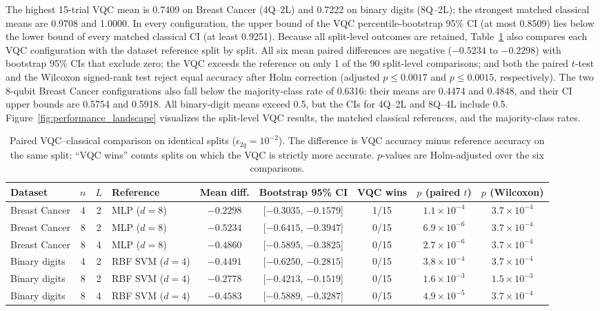 \documentclass[final,5p,times,number]{elsarticle}
\begin{document}
The highest 15-trial VQC mean is 0.7409 on Breast Cancer (4Q--2L) and
0.7222 on binary digits (8Q--2L); the strongest matched classical means
are 0.9708 and 1.0000. In every configuration, the upper bound of the VQC
percentile-bootstrap 95\% CI (at most 0.8509) lies below the lower bound
of every matched classical CI (at least 0.9251). Because all split-level
outcomes are retained, Table~\ref{tab:paired} also compares each VQC
configuration with the dataset reference split by split. All six mean
paired differences are negative ($-0.5234$ to $-0.2298$) with bootstrap
95\% CIs that exclude zero; the VQC exceeds the reference on only 1 of
the 90 split-level comparisons; and both the paired $t$-test and the
Wilcoxon signed-rank test reject equal accuracy after Holm correction
(adjusted $p\le0.0017$ and $p\le0.0015$, respectively). The two
8-qubit Breast Cancer configurations also fall below the majority-class
rate of 0.6316: their means are 0.4474 and 0.4848, and their CI upper
bounds are 0.5754 and 0.5918. All binary-digit means exceed 0.5, but the
CIs for 4Q--2L and 8Q--4L include 0.5.
Figure~\ref{fig:performance_landscape} visualizes the split-level VQC
results, the matched classical references, and the majority-class rates.

\begin{table}[!t]
\centering
\caption{Paired VQC--classical comparison on identical splits ($\epsilon_{2q}=10^{-2}$). The difference is VQC accuracy minus reference accuracy on the same split; ``VQC wins'' counts splits on which the VQC is strictly more accurate. $p$-values are Holm-adjusted over the six comparisons.}
\label{tab:paired}
\small
\begin{tabular}{lcclccccc}
\toprule
\textbf{Dataset} & \textbf{$n$} & \textbf{$L$} & \textbf{Reference} & \textbf{Mean diff.} & \textbf{Bootstrap 95\% CI} & \textbf{VQC wins} & \textbf{$p$ (paired $t$)} & \textbf{$p$ (Wilcoxon)} \\
\midrule
Breast Cancer & 4 & 2 & MLP ($d=8$) & $-0.2298$ & [$-0.3035$, $-0.1579$] & 1/15 & $1.1\times10^{-4}$ & $3.7\times10^{-4}$ \\
Breast Cancer & 8 & 2 & MLP ($d=8$) & $-0.5234$ & [$-0.6415$, $-0.3947$] & 0/15 & $6.9\times10^{-6}$ & $3.7\times10^{-4}$ \\
Breast Cancer & 8 & 4 & MLP ($d=8$) & $-0.4860$ & [$-0.5895$, $-0.3825$] & 0/15 & $2.7\times10^{-6}$ & $3.7\times10^{-4}$ \\
Binary digits & 4 & 2 & RBF SVM ($d=4$) & $-0.4491$ & [$-0.6250$, $-0.2815$] & 0/15 & $3.8\times10^{-4}$ & $3.7\times10^{-4}$ \\
Binary digits & 8 & 2 & RBF SVM ($d=4$) & $-0.2778$ & [$-0.4213$, $-0.1519$] & 0/15 & $1.6\times10^{-3}$ & $1.5\times10^{-3}$ \\
Binary digits & 8 & 4 & RBF SVM ($d=4$) & $-0.4583$ & [$-0.5889$, $-0.3287$] & 0/15 & $4.9\times10^{-5}$ & $3.7\times10^{-4}$ \\
\bottomrule
\end{tabular}
\end{table}
\end{document}
